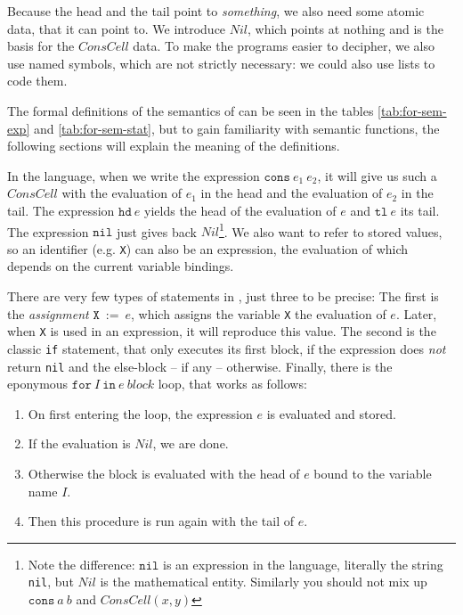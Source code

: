 Because the head and the tail point to \emph{something}, we also need some 
atomic data, that it can point to. We introduce $Nil$, which points at 
nothing and is the basis for the $ConsCell$ data. To make the programs easier to decipher, we also use named symbols, which are not strictly necessary: we could also use lists to code them.

The formal definitions of the semantics of \FOR can be seen in the tables 
\ref{tab:for-sem-exp} and \ref{tab:for-sem-stat}, but to gain familiarity 
with semantic functions, the following sections will explain the meaning of 
the definitions.

In the \FOR language, when we write the expression $\mathtt{cons}\: e_1\: e_2$, it
will give us such a $ConsCell$ with the evaluation of $e_1$ in the head and the
evaluation of $e_2$ in the tail. The expression $\mathtt{hd}\: e$ yields the head of
the evaluation of $e$ and $\mathtt{tl}\: e$ its tail. The expression 
$\mathtt{nil}$ just gives back $Nil$\footnote{
	Note the difference: $\mathtt{nil}$ is an expression in the language,
	literally the string {\tt nil}, but $Nil $ is the mathematical entity.
	Similarly you should not mix up $\mathtt{cons}\: a\: b$ and $ConsCell(x, y)$}.
We also want to refer to stored values, so an identifier (e.g. {\tt X}) can
also be an expression, the evaluation of which depends on the current variable
bindings.

There are very few types of statements in \FOR, just three to be precise: The 
first is the \emph{assignment} $\mathtt{X}\:\mathtt{:=}\: e$, which assigns the variable {\tt X}
the evaluation of $e$. Later, when {\tt X} is used in an expression, it 
will reproduce this value. The second is the classic {\tt if} statement, that 
only executes its first block, if the expression does \emph{not} return {\tt nil} 
and the else-block -- if any -- otherwise. Finally, there is the eponymous 
$\mathtt{for}\: I\: \mathtt{in}\: e\: block$ loop, that works as follows:

\begin{enumerate}
	\item On first entering the loop, the expression $e$ is evaluated and stored.
	\item If the evaluation is $Nil$, we are done.
	\item Otherwise the block is evaluated with the head of $e$ bound to the 
		variable name $I$.
	\item Then this procedure is run again with the tail of $e$.
\end{enumerate}

